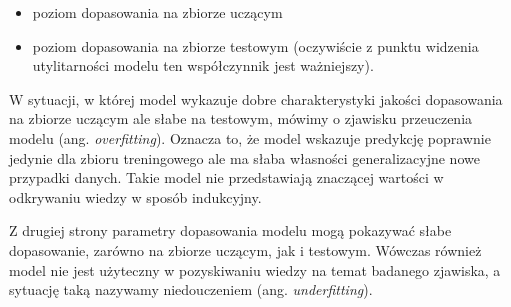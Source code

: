 \documentclass[]{book}
\providecommand{\tightlist}{%
  \setlength{\itemsep}{0pt}\setlength{\parskip}{0pt}}
\theoremstyle{plain}
\theoremstyle{definition}
\begin{document}
\begin{itemize}
\tightlist
\item
  poziom dopasowania na zbiorze uczącym
\item
  poziom dopasowania na zbiorze testowym (oczywiście z punktu widzenia utylitarności modelu ten współczynnik jest ważniejszy).
\end{itemize}

W sytuacji, w której model wykazuje dobre charakterystyki jakości dopasowania na zbiorze uczącym ale słabe na testowym, mówimy o zjawisku przeuczenia modelu (ang. \emph{overfitting}). Oznacza to, że model wskazuje predykcję poprawnie jedynie dla zbioru treningowego ale ma słaba własności generalizacyjne nowe przypadki danych. Takie model nie przedstawiają znaczącej wartości w odkrywaniu wiedzy w sposób indukcyjny.

Z drugiej strony parametry dopasowania modelu mogą pokazywać słabe dopasowanie, zarówno na zbiorze uczącym, jak i testowym. Wówczas również model nie jest użyteczny w pozyskiwaniu wiedzy na temat badanego zjawiska, a sytuację taką nazywamy niedouczeniem (ang. \emph{underfitting}).
\end{document}
